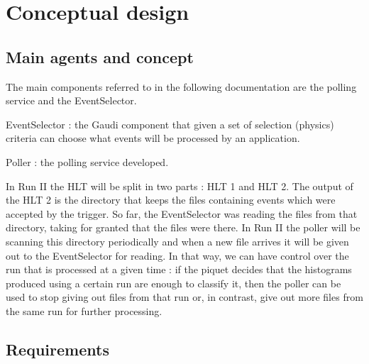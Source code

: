 \section{Conceptual design}
\label{sec:concept}

\subsection{\textbf{Main agents and concept}}
The main components referred to in the following documentation are the polling service and the EventSelector.\par
EventSelector : the Gaudi component that given a set of selection (physics) criteria can choose what events will be processed by an application.\par
Poller : the polling service developed.\par
\bigskip\noindent
In Run II the HLT will be split in two parts : HLT 1 and HLT 2. The output of  the HLT 2 is the directory that keeps the files containing events which were accepted by the trigger. So far, the EventSelector was reading the files from that directory, taking for granted that the files were there. In Run II the poller will be scanning this directory periodically and when a new file arrives it will be given out to the EventSelector for reading. In that way, we can have control over the run that is processed at a given time : if the piquet decides that the histograms produced using a certain run are enough to classify it, then the poller can be used to stop giving out files from that run or, in contrast,  give out more files from the same run for further processing.

\subsection{\textbf{Requirements}}

